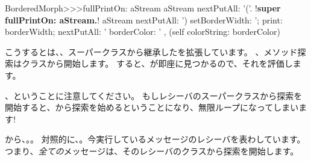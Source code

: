 \documentclass[a4paper,10pt,twoside]{book}
\begin{document}

\begin{method}[fullPrintOn]{}
BorderedMorph>>>fullPrintOn: aStream
	aStream nextPutAll: '('.
	!\textbf{super fullPrintOn: aStream.}!
	aStream nextPutAll: ') setBorderWidth: '; print: borderWidth;
		nextPutAll: ' borderColor: ' , (self colorString: borderColor)
\end{method}
こうするとは、、スーパークラスから継承したを拡張しています。
、メソッド探索はクラスから開始します。
すると、が即座に見つかるので、それを評価します。

、ということに注意してください。
もしレシーバのスーパークラスから探索を開始すると、から探索を始めるということになり、無限ループになってしまいます!


から、。。
対照的に、。今実行しているメッセージのレシーバを表わしています。つまり、\emph{全ての}メッセージは、そのレシーバのクラスから探索を開始します。
\end{document}
